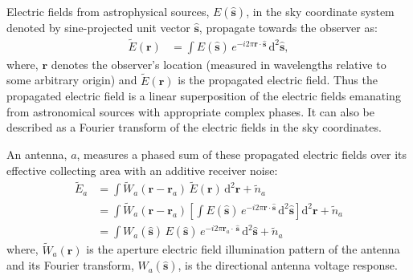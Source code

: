 \documentclass[a4paper,fleqn,usenatbib]{../mnras}
\newcommand{\dif}{\mathrm{d}}
\begin{document}
Electric fields from astrophysical sources, $E(\hat{\mathbf{s}})$, in the sky
coordinate system denoted by sine-projected unit vector $\hat{\mathbf{s}}$, 
propagate towards the observer as:
\begin{align}
  \widetilde{E}(\mathbf{r}) &= \int E(\hat{\mathbf{s}})\,e^{-i2\pi\mathbf{r}\cdot\hat{\mathbf{s}}}\,\dif^2\hat{\mathbf{s}},
\end{align}
where, $\mathbf{r}$ denotes the observer's location (measured in wavelengths 
relative to some arbitrary origin) and $\widetilde{E}
(\mathbf{r})$ is the propagated electric field. Thus the propagated electric
field is a linear superposition of the electric fields emanating from
astronomical sources with appropriate complex phases. It can also be described
as a Fourier transform of the electric fields in the sky coordinates. 

An antenna, $a$, measures a phased sum of these propagated electric fields over
its effective collecting area with an additive receiver noise:
\begin{align}\label{eqn:measured-E-field}
  \widetilde{E}_a &= \int \widetilde{W}_a(\mathbf{r}-\mathbf{r}_a)\,\widetilde{E}(\mathbf{r})\,\dif^2\mathbf{r} + \widetilde{n}_a \\
                  &= \int \widetilde{W}_a(\mathbf{r}-\mathbf{r}_a) \left[ \int E(\hat{\mathbf{s}})\,e^{-i2\pi\mathbf{r}\cdot\hat{\mathbf{s}}}\,\dif^2\hat{\mathbf{s}} \right] \dif^2\mathbf{r} + \widetilde{n}_a \\
                  &= \int {W}_a(\hat{\mathbf{s}})\,E(\hat{\mathbf{s}})\,e^{-i2\pi\mathbf{r}_a\!\cdot\,\hat{\mathbf{s}}}\,\dif^2\hat{\mathbf{s}} + \widetilde{n}_a
\end{align}
where, $\widetilde{W}_a(\mathbf{r})$ is the aperture electric field illumination
pattern of the antenna and its Fourier transform, $W_a(\hat{\mathbf{s}})$, is the
directional antenna voltage response.
\end{document}
